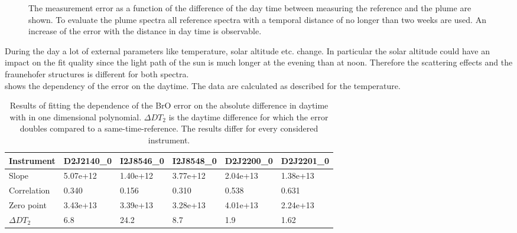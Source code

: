 \documentclass  [
  paper    = a4,
  BCOR     = 10mm,
  twoside,
  fontsize = 12pt,
  fleqn,
  toc      = bibnumbered,
  toc      = listofnumbered,
  numbers  = noendperiod,
  headings = normal,
  listof   = leveldown,
  version  = 3.03
]                                       {scrreprt}
\begin{document}
\begin{figure}
		\caption{The   measurement error as a function of the difference of the day time between measuring the reference and the plume are shown. To evaluate the plume spectra all reference spectra with a temporal distance of no longer than two weeks are used. An increase of the  error with the distance in day time is observable.}
		\label{fig:diffdaytime}
	\end{figure}
	During the day a lot of external parameters like temperature, solar altitude etc. change. In particular the solar altitude could have an impact on the fit quality since the light path of the sun is much longer at the evening than at noon. Therefore the scattering effects and the fraunehofer structures is different for both spectra.\\
	 shows the dependency of the  error on the daytime. The data are calculated as described for the temperature. 
	

	\begin{table}[h]
		\begin{tabular}{|p{2cm}|p{2cm}|p{2cm}|p{2cm}|p{2cm}|p{2cm}|}
			Instrument	&D2J2140\_0&I2J8546\_0& I2J8548\_0&D2J2200\_0&D2J2201\_0\\
			\toprule
			Slope&5.07e+12&1.40e+12 &3.77e+12 &2.04e+13& 1.38e+13\\
			\midrule
			Correlation&
			0.340&
			0.156&
			0.310&
			0.538&
			0.631\\
			\midrule
			Zero point& 3.43e+13&3.39e+13&3.28e+13&  4.01e+13&  2.24e+13\\
			\midrule
			$\Delta DT_{2}$&6.8&24.2&8.7&1.9&1.62\\
			\bottomrule
		\end{tabular}
		\label{tab:dtcalc}
		\caption{Results of fitting the dependence of the BrO error on the absolute difference in daytime with in one dimensional polynomial. $\Delta DT_{2}$ is the daytime difference for which the error doubles compared to a same-time-reference. The results differ for every considered instrument.}
	\end{table}
\end{document}
